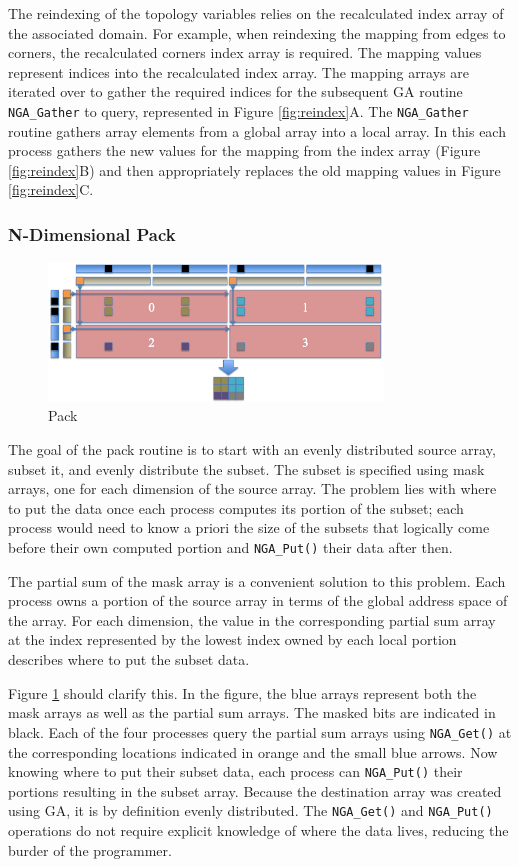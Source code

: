The reindexing of the topology variables relies on the recalculated index
array of the associated domain.  For example, when reindexing the mapping from
edges to corners, the recalculated corners index array is required.  The
mapping values represent indices into the recalculated index array.  The
mapping arrays are iterated over to gather the required indices for the
subsequent GA routine \verb=NGA_Gather= to query, represented in Figure
\ref{fig:reindex}A.  The \verb=NGA_Gather= routine gathers array elements from
a global array into a local array.  In this each process gathers the new
values for the mapping from the index array (Figure \ref{fig:reindex}B) and
then appropriately replaces the old mapping values in Figure
\ref{fig:reindex}C.

\subsubsection{N-Dimensional Pack}
\label{section:alg_pack}

\begin{figure}[!t]
\center
\includegraphics[width=3.5in]{images/pack}
\caption{Pack}
\label{fig:pack}
\end{figure}

The goal of the pack routine is to start with an evenly distributed source
array, subset it, and evenly distribute the subset.  The subset is specified
using mask arrays, one for each dimension of the source array.  The problem
lies with where to put the data once each process computes its portion of the
subset; each process would need to know a priori the size of the subsets that
logically come before their own computed portion and \verb=NGA_Put()= their
data after then.

The partial sum of the mask array is a convenient solution to this problem.
Each process owns a portion of the source array in terms of the global address
space of the array.  For each dimension, the value in the corresponding
partial sum array at the index represented by the lowest index owned by each
local portion describes where to put the subset data.

Figure \ref{fig:pack} should clarify this.  In the figure, the blue arrays
represent both the mask arrays as well as the partial sum arrays.  The masked
bits are indicated in black.  Each of the four processes query the partial sum
arrays using \verb=NGA_Get()= at the corresponding locations indicated in
orange and the small blue arrows.  Now knowing where to put their subset data,
each process can \verb=NGA_Put()= their portions resulting in the subset
array.  Because the destination array was created using GA, it is by
definition evenly distributed.  The \verb=NGA_Get()= and \verb=NGA_Put()=
operations do not require explicit knowledge of where the data lives,
reducing the burder of the programmer.
